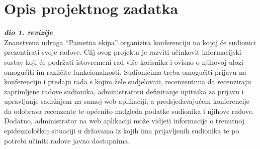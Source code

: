 \chapter{Opis projektnog zadatka}
		
		\textbf{\textit{dio 1. revizije}}\\

		Znanstvena udruga “Pametna ekipa” organizira konferenciju na kojoj će sudionici prezentirati svoje radove. Cilj ovog projekta je razviti učinkovit informacijski sustav koji će podržati istovremeni rad više korisnika i ovisno o njihovoj ulozi omogućiti im različite funkcionalnosti. Sudionicima treba omogućiti prijavu na konferenciju i predaju rada s kojim žele sudjelovati, recenzentima da recenziraju zaprimljene radove sudionika, administratoru definiranje upitnika za prijavu i upravljanje sadržajem na samoj web aplikaciji, a predsjedavajućem konferencije da odobrava recenzente te općenito nadgleda podatke sudionika i njihove radove. Dodatno, administrator na web aplikaciji može vidjeti informacije o trenutnoj epidemiološkoj situaciji u državama iz kojih ima prijavljenih sudionika te po potrebi učiniti radove javno dostupnima.
		\newline
		\newline

